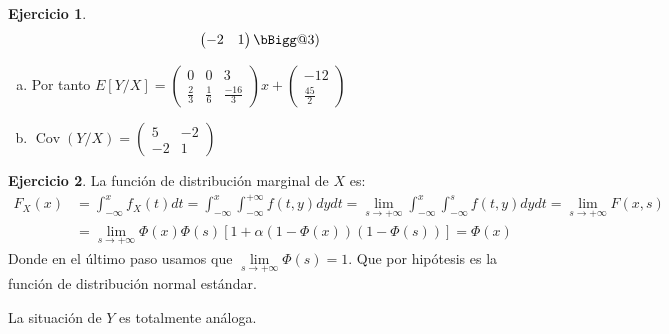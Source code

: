 \documentclass[12pt,spanish]{article}
\makeatletter
\newcommand{\vast}{\bBigg@{3}}
\theoremstyle{definition}
\newtheorem{exercise}{Ejercicio}
\makeatother
\begin{document}
\begin{exercise}
\[\begin{pmatrix}
        -2 & 1
      \end{pmatrix}\vast)\]
  \begin{enumerate}[a)]
  \item Por tanto $E[Y/X]=\begin{pmatrix}
        0 & 0 & 3 \\
        \frac{2}{3} & \frac{1}{6} & \frac{-16}{3}
      \end{pmatrix}x+
      \begin{pmatrix}
        -12 \\ \frac{45}{2}
      \end{pmatrix}$
    \item $\operatorname{Cov}(Y/X)=\begin{pmatrix}
        5 & -2 \\
        -2 & 1
      \end{pmatrix}$
  \end{enumerate}
\end{exercise}

\begin{exercise}
  La función de distribución marginal de $X$ es:
  \begin{align*}
    F_X(x)&=\int_{-\infty}^xf_X(t)dt=\int_{-\infty}^x\int_{-\infty}^{+\infty}f(t,y)dydt=\lim_{s\to+\infty}\int_{-\infty}^x\int_{-\infty}^sf(t,y)dydt=\lim_{s\to+\infty}F(x,s) \\
          &=\lim_{s\to+\infty}\Phi(x)\Phi(s)[1+\alpha(1-\Phi(x))(1-\Phi(s))] = \Phi(x)
  \end{align*}
  Donde en el último paso usamos que
  $\lim\limits_{s\to+\infty}\Phi(s)=1$.
  Que por hipótesis es la función de distribución normal estándar.

  La situación de $Y$ es totalmente análoga.
\end{exercise}
\end{document}
